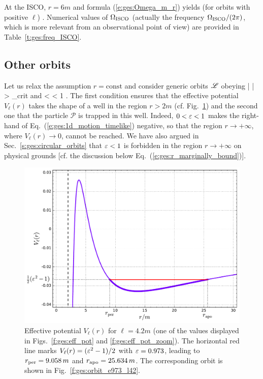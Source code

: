 At the ISCO, $r=6m$ and formula (\ref{e:ges:Omega_m_r}) yields (for orbits with positive $\ell$)
\be
     .
\ee
Numerical values of $\Omega_{\rm ISCO}$ (actually the frequency $\Omega_{\rm ISCO}/(2\pi)$,
which is more relevant from an observational point of view) are provided in
Table~\ref{t:ges:freq_ISCO}.

\subsection{Other orbits}

Let us relax the assumption $r=\mathrm{const}$ and consider generic orbits $\mathscr{L}$
obeying
\be
    | \ell | > \ell_{\rm crit} \qquad\mbox{and} < \veps < 1 .
\ee
The first condition ensures that the effective potential $V_{\ell}(r)$
takes the shape of a well in the region $r>2m$ (cf. Fig.~\ref{f:ges:eff_pot_bound})
and the second one that the particle $\mathscr{P}$ is trapped in this well.
Indeed, $0 < \varepsilon < 1$  makes the right-hand of Eq.~(\ref{e:ges:1d_motion_timelike}) negative, so
that the region $r\to +\infty$, where $V_{\ell}(r)\to 0$,
cannot be reached. We have also argued in Sec.~\ref{s:ges:circular_orbits}
that $\varepsilon < 1$ is forbidden in the region $r\to +\infty$ on physical
grounds [cf. the discussion below Eq.~(\ref{e:ges:r_marginally_bound})].

\begin{figure}
\centerline{\includegraphics[height=0.4\textheight]{ges_eff_pot_bound.pdf}}
\caption[]{\label{f:ges:eff_pot_bound} \footnotesize
Effective potential $V_{\ell}(r)$ for $\ell = 4.2 m$ (one of the values displayed
in Figs.~\ref{f:ges:eff_pot}  and \ref{f:ges:eff_pot_zoom}).
The horizontal red line marks $V_{\ell}(r) = (\varepsilon^2-1)/2$
with $\varepsilon = 0.973$, leading to $r_{\rm per} = 9.058\, m$ and $r_{\rm apo} = 25.634\, m$.
The corresponding orbit is shown in Fig.~\ref{f:ges:orbit_e973_l42}.
}
\end{figure}

